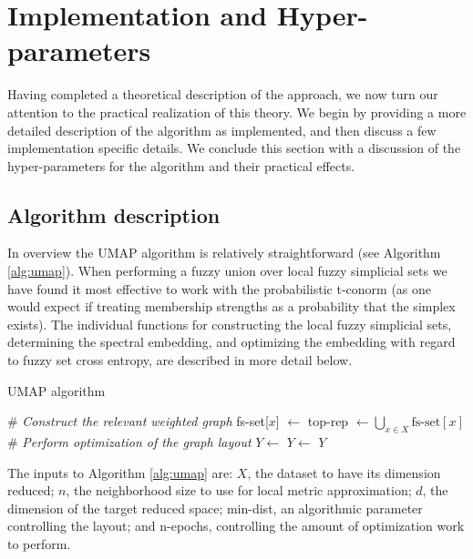 \documentclass[12pt]{article}
\begin{document}
\section{Implementation and Hyper-parameters}\label{implementation}

Having completed a theoretical description of the approach, we now turn our attention to the practical realization of this theory. We begin by providing a more detailed description of the algorithm as implemented, and then discuss a few implementation specific details. We conclude this section with a discussion of the hyper-parameters for the algorithm and their practical effects.

\subsection{Algorithm description}\label{algorithm}

In overview the UMAP algorithm is relatively straightforward (see Algorithm \ref{alg:umap}). When performing a fuzzy union over local fuzzy simplicial sets we have found it most effective to work with the probabilistic t-conorm (as one would expect if treating membership strengths as a probability that the simplex exists). The individual functions for constructing the local fuzzy simplicial sets, determining the spectral embedding, and optimizing the embedding with regard to fuzzy set cross entropy, are described in more detail below.

\begin{algorithm}[!htbp]
\caption{UMAP algorithm}\label{alg:umap}
\begin{algorithmic}[0]
\setlength\baselineskip{18pt}
    \State
    \State \# \textit{Construct the relevant weighted graph}
        \State fs-set[$x$] $\gets$ 
    \EndFor
    \State top-rep $\gets \bigcup_{x\in X} \textrm{fs-set}[x]$ 
    \State
    \State \# \textit{Perform optimization of the graph layout}
    \State $Y \gets$ 
    \State $Y \gets$ 
    \State \Return $Y$
\EndFunction\vskip9pt
\end{algorithmic}
\end{algorithm}

The inputs to Algorithm \ref{alg:umap} are: $X$, the dataset to have its dimension reduced; $n$, the neighborhood size to use for local metric approximation; $d$, the dimension of the target reduced space; min-dist, an algorithmic parameter controlling the layout; and n-epochs, controlling the amount of optimization work to perform.
\end{document}
